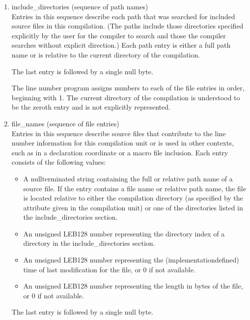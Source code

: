 \begin{enumerate}[1.]
\item include\_directories (sequence of path names) \\
Entries in this sequence describe each path that was searched
for included source files in this compilation. (The paths
include those directories specified explicitly by the user for
the compiler to search and those the compiler searches without
explicit direction.) Each path entry is either a full path name
or is relative to the current directory of the compilation.

The last entry is followed by a single null byte.

The line number program assigns numbers to each of the file
entries in order, beginning with 1. The current directory of
the compilation is understood to be the zeroth entry and is
not explicitly represented.

\item  file\_names (sequence of file entries) \\
Entries in this sequence describe source files that contribute
to the line number information for this compilation unit or is
used in other contexts, such as in a declaration coordinate or
a macro file inclusion. Each entry consists of the following
values:


\begin{itemize}
\item A null\dash terminated string containing the full or relative
path name of a source file. If the entry contains a file
name or relative path name, the file is located relative
to either the compilation directory (as specified by the
 attribute given in the compilation unit) or one
of the directories listed in the include\_directories section.

\item An unsigned LEB128 number representing the directory
index of a directory in the include\_directories section.


\item An unsigned LEB128 number representing the
(implementation\dash defined) time of last modification for
the file, or 0 if not available.

\item An unsigned LEB128 number representing the length in
bytes of the file, or 0 if not available.  

\end{itemize}

The last entry is followed by a single null byte.


\end{enumerate}
